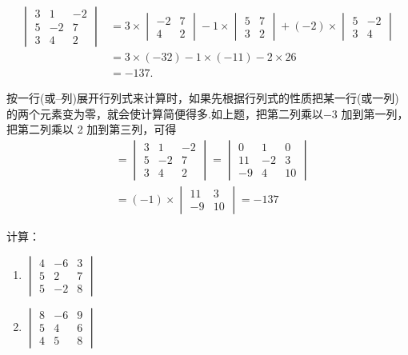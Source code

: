 \begin{solution}
\[\begin{split}
  \begin{vmatrix}3&1&-2\\5&-2&7\\3&4&2\end{vmatrix}&=3\times\begin{vmatrix}-2&7\\4&2\end{vmatrix}-1\times\begin{vmatrix}5&7\\3&2\end{vmatrix}+(-2)\times\begin{vmatrix}5&-2\\3&4\end{vmatrix}\\
&=3\times(-32)-1\times(-11)-2\times26\\
&=-137.
\end{split}\]
\end{solution}


按一行(或--列)展开行列式来计算时，如果先根据行列式的性质把某一行(或一列)的两个元素变为零，就会使计算简便得多.如上题，把第二列乘以$-3$ 加到第一列，把第二列乘以 2 加到第三列，可得
\[\begin{split}&=
  \begin{vmatrix}3&1&-2\\5&-2&7\\3&4&2
  \end{vmatrix}
  =\begin{vmatrix}0&1&0\\11&-2&3\\-9&4&10
  \end{vmatrix}\\&=(-1)\times
  \begin{vmatrix}11&3\\-9&10\end{vmatrix}=-137
\end{split}\]

\begin{example}
  计算：
\begin{multicols}{2}
\begin{enumerate}[(1)]
  \item $\begin{vmatrix}4&-6&3\\5&2&7\\5&-2&8\end{vmatrix}$
  \item $\begin{vmatrix}8&-6&9\\5&4&6\\4&5&8\end{vmatrix}$
\end{enumerate}
\end{multicols}
\end{example}

